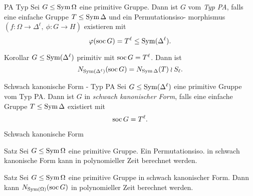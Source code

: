 

\begin{frame}{PA Typ}
Sei $G \leq \operatorname{Sym} \Omega$ eine primitive Gruppe.
Dann ist $G$ vom \emph{Typ PA}, falls
eine einfache Gruppe
$T \leq \operatorname{Sym} \Delta$
und ein Permutationsiso-
morphismus $(f : \Omega \to \Delta ^ \ell,~ \phi : G \to H)$ existieren
mit
\[
\varphi (\operatorname{soc} G) = T ^ \ell \leq \operatorname{Sym}(\Delta ^ \ell).
\]

\pause
\begin{block}{Korollar}
$G \leq \operatorname{Sym}(\Delta ^ \ell)$ primitiv mit
$\operatorname{soc} G = T ^ \ell$.
Dann ist
\[
    N_{\operatorname{Sym} (\Delta ^ \ell)}(\operatorname{soc} G) =
    N_{\operatorname{Sym} \Delta}(T) \wr S_\ell.
\]
\end{block}
\end{frame}

\begin{frame}{Schwach kanonische Form - Typ PA}
Sei $G \leq \operatorname{Sym}(\Delta ^ \ell)$ eine primitive Gruppe vom Typ PA.
\pause
Dann ist $G$ in \emph{schwach kanonischer Form}, falls
eine einfache Gruppe
$T \leq \operatorname{Sym} \Delta$
existiert mit
\[
\operatorname{soc} G = T ^ \ell.
\]
\end{frame}


\begin{frame}{Schwach kanonische Form}
\begin{block}{Satz}
Sei $G \leq \operatorname{Sym} \Omega$ eine primitive Gruppe. Ein Permutationsiso. in schwach
kanonische Form kann in polynomieller Zeit berechnet werden.
\end{block}

\pause
\begin{block}{Satz}
Sei $G \leq \operatorname{Sym} \Omega$ eine primitive Gruppe in schwach kanonischer Form.
Dann kann $N_{\operatorname{Sym} (\Omega)}(\operatorname{soc} G)$
in polynomieller Zeit berechnet werden.
\end{block}
\end{frame}


